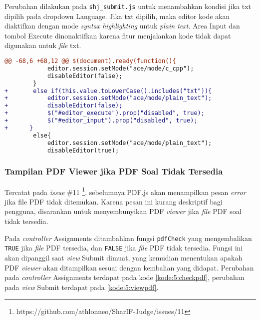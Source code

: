 Perubahan dilakukan pada \verb|shj_submit.js| untuk menambahkan kondisi jika txt dipilih pada dropdown Language. Jika txt dipilih, maka editor kode akan diaktifkan dengan mode \textit{syntax highlighting} untuk \textit{plain text}. Area Input dan tombol Execute dinonaktifkan karena fitur menjalankan kode tidak dapat digunakan untuk \textit{file} txt.

\begin{lstlisting}[language=diff, caption=Perubahan pada \texttt{shj\_submit.js}, label=kode:5:uptxt]
@@ -68,6 +68,12 @@ $(document).ready(function(){
            editor.session.setMode("ace/mode/c_cpp");
            disableEditor(false);
        }
+       else if(this.value.toLowerCase().includes("txt")){
+           editor.session.setMode("ace/mode/plain_text");
+           disableEditor(false);
+           $("#editor_execute").prop("disabled", true);
+           $("#editor_input").prop("disabled", true);
+      }
        else{
            editor.session.setMode("ace/mode/plain_text");
            disableEditor(true);
\end{lstlisting}

\subsubsection{Tampilan PDF Viewer jika PDF Soal Tidak Tersedia}
Tercatat pada \textit{issue} \#11 \footnote{https://github.com/athlonneo/SharIF-Judge/issues/11}, sebelumnya PDF.js akan menampilkan pesan \textit{error} jika file PDF tidak ditemukan. Karena pesan ini kurang deskriptif bagi pengguna, disarankan untuk menyembunyikan PDF \textit{viewer} jika \textit{file} PDF soal tidak tersedia.

Pada \textit{controller} Assignments ditambahkan fungsi \verb|pdfCheck| yang mengembalikan \verb|TRUE| jika \textit{file} PDF tersedia, dan \verb|FALSE| jika \textit{file} PDF tidak tersedia. Fungsi ini akan dipanggil saat \textit{view} Submit dimuat, yang kemudian menentukan apakah PDF \textit{viewer} akan ditampilkan sesuai dengan kembalian yang didapat. Perubahan pada \textit{controller} Assignments terdapat pada kode \ref{kode:5:checkpdf}, perubahan pada \textit{view} Submit terdapat pada \ref{kode:5:viewpdf}.

